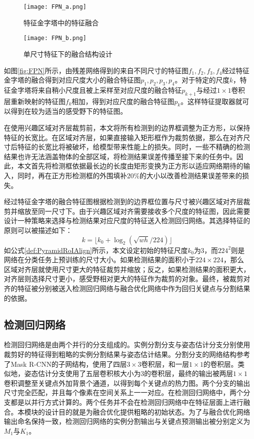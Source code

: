\begin{figure*}[htbp]	
	\centering
	\begin{subfigure}[b]{0.4\textwidth}
		\texttt{[image: FPN\_a.png]}
		\caption{特征金字塔中的特征融合}
	\end{subfigure}
	\hskip1.5cm
	\begin{subfigure}[b]{0.4\textwidth}
		\texttt{[image: FPN\_b.png]}
		\caption{单尺寸特征下的融合结构设计}
	\end{subfigure}
	\caption{特征金字塔中的结构设计}
	\label{fig:FPN}
\end{figure*}

如图\ref{fig:FPN}所示，由残差网络得到的来自不同尺寸的特征图$f_1, f_2, f_3, f_4$经过特征金字塔的融合得到对应尺度大小的融合特征图$p_1, p_2, p_3, p_4$。对于特定的尺度$k$，特征金字塔将来自稍小尺度且被上采样至对应尺度的融合特征$p_{k+1}$与经过$1\times1$卷积层重新映射的特征图$f_k$相加，得到对应尺度的融合特征图$p_k$。这样特征提取器就可以得到在较为适当的感受野下的特征图。

在使用兴趣区域对齐层裁剪前，本文将所有检测到的边界框调整为正方形，以保持特征的长宽比。在区域对齐层，如果直接输入矩形框作为裁剪依据，那么在对齐尺寸后特征的长宽比将被破坏，给模型带来性能上的损失。同时，一些不精确的检测结果也许无法涵盖物体的全部区域，将检测结果误差传播至接下来的任务中。因此，本文首先将检测框依据最长边的长度由矩形变换为正方形以适应网络期待的输入，同时，再在正方形检测框的外围填补20\%的大小以改善检测结果误差带来的损失。

经过特征金字塔的融合特征图根据检测到的边界框位置与尺寸被兴趣区域对齐层裁剪并缩放至同一尺寸下。由于兴趣区域对齐需要接收多个尺度的特征图，因此需要设计一种策略来选择与检测结果对应尺度的特征送入检测回归网络。其选择特征的原则可以被描述如下：
\begin{equation}
\label{def:PyramidRoIAlign}
k =\lfloor k_0 + \log_{2}(\sqrt{wh} / 224) \rfloor
\end{equation}
如公式\eqref{def:PyramidRoIAlign}所示，本文设定初始的特征尺度$k_0$为3，而$224^2$则是网络在分类任务上预训练的尺寸大小。如果检测结果的面积小于$224\times224$，那么区域对齐层就使用尺寸更大的特征裁剪并缩放；反之，如果检测结果的面积更大，对齐层则选择尺寸更小，感受野相对更大的特征作为裁剪的对象。最终，被裁剪对齐的特征被分别被送入检测回归网络与融合优化网络中作为回归关键点与分割结果的依据。

\subsection{检测回归网络}
\label{subsec:detection}
检测回归网络是由两个并行的分支组成的。实例分割分支与姿态估计分支分别使用裁剪好的特征得到粗略的实例分割结果与姿态估计结果。分割分支的网络结构参考了Mask R-CNN\cite{He2017Mask}的子网结构，使用了四层$3\times3$卷积层，和一层$1\times1$的卷积层。类似地，姿态估计分支使用了五层卷积核大小为3的卷积层，最终的输出被两层$1\times1$卷积调整至关键点外加背景个通道，以得到每个关键点的热力图。两个分支的输出尺寸完全匹配，并且每个像素在空间关系上一一对应。在检测回归网络中，两个分支都是以并行方式计算的。两个任务并不会在检测回归网络中在特征层面上进行融合。本模块的设计目的就是为融合优化提供粗略的初始状态。为了与融合优化网络输出命名保持一致，检测回归网络的实例分割输出与关键点预测输出被分别定义为$M_1$与$K_1$。

